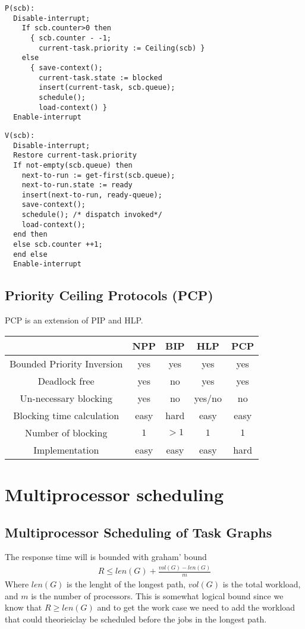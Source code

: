 \begin{verbatim}
P(scb):
  Disable-interrupt;
    If scb.counter>0 then
      { scb.counter - -1;
        current-task.priority := Ceiling(scb) }
    else
      { save-context();
        current-task.state := blocked
        insert(current-task, scb.queue);
        schedule();
        load-context() }
  Enable-interrupt
\end{verbatim}

\begin{verbatim}
V(scb):
  Disable-interrupt;
  Restore current-task.priority
  If not-empty(scb.queue) then
    next-to-run := get-first(scb.queue);
    next-to-run.state := ready
    insert(next-to-run, ready-queue);
    save-context();
    schedule(); /* dispatch invoked*/
    load-context();
  end then
  else scb.counter ++1;
  end else
  Enable-interrupt
\end{verbatim}


\subsection{Priority Ceiling Protocols (PCP)}
PCP is an extension of PIP and HLP.



\begin{table}[H]
  \centering
\begin{tabular}{ |c|c|c|c|c| } 
  \hline
                             & NPP  & BIP  & HLP    & PCP \\
  \hline
  Bounded Priority Inversion & yes  & yes  & yes    & yes \\
  \hline
  Deadlock free              & yes  & no   & yes    & yes \\
  \hline
  Un-necessary blocking      & yes  & no   & yes/no & no \\
  \hline
  Blocking time calculation  & easy & hard & easy   & easy \\
  \hline
  Number of blocking         & $1$  & $>1$ & $1$    & $1$ \\
  \hline
  Implementation             & easy & easy & easy   & hard \\
  \hline
\end{tabular}
\end{table}


\section{Multiprocessor scheduling}

\subsection{Multiprocessor Scheduling of Task Graphs}
The response time will is bounded with graham' bound
\begin{align*}
  R \leq len(G) + \frac{vol(G) - len(G)}{m}
\end{align*}
Where $len(G)$ is the lenght of the longest path, $vol(G)$ is the 
total workload, and $m$ is the number of processors. This is somewhat 
logical bound since we know that $R \geq len(G)$ and to get the work case 
we need to add the workload that could theorieiclay be scheduled before 
the jobs in the longest path.

